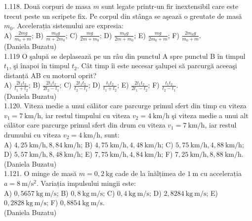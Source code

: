 1.118. Două corpuri de masa $m$ sunt legate printr-un fir inextensibil care este trecut peste un scripete fix. Pe corpul din stânga se aşează o greutate de masă $m_{0}$. Accelerația sistemului are expresia:\\ A) $\frac{2 m g}{m_{0}+m}$; B) $\frac{m_{0} g}{m+2 m_{0}}$; C) $\frac{m g}{2 m+m_{0}}$; D) $\frac{m_{0} g}{2 m+m_{0}}$; E) $\frac{m g}{2 m_{0}+m}$; F) $\frac{2 m_{0} g}{m_{0}+m}$.\\ (Daniela Buzatu)\\

1.119 O şalupă se deplasează pe un râu din punctul A spre punctul B în timpul $t_{1}$, şi înapoi în timpul $t_{2}$. Cât timp îi este necesar şalupei să parcurgă aceeaşi distanță AB cu motorul oprit?\\ A) $\frac{2 t_{1} t_{2}}{t_{1}+t_{2}}$; B) $\frac{2 t_{1} t_{2}}{2 t_{2}-t_{1}}$; C) $\frac{2 t_{1} t_{2}}{t_{2}-t_{1}}$; D) $\frac{t_{1} t_{2}}{t_{1}+t_{2}}$; E) $\frac{2 t_{1} t_{2}}{2 t_{1}-t_{2}}$; F) $\frac{t_{1} t_{2}}{t_{2}-t_{1}}$.\\ (Daniela Buzatu)\\

1.120. Viteza medie a unui călātor care parcurge primul sfert din timp cu viteza $v_{1}=7 \mathrm{~km} / \mathrm{h}$, iar restul timpului cu viteza $v_{2}=4 \mathrm{~km} / \mathrm{h}$ şi viteza medie a unui alt călător care parcurge primul sfert din drum cu viteza $v_{1}=7 \mathrm{~km} / \mathrm{h}$, iar restul drumului cu viteza $v_{2}=4 \mathrm{~km} / \mathrm{h}$, sunt:\\ A) $4,25 \mathrm{~km} / \mathrm{h}, 8,84 \mathrm{~km} / \mathrm{h}$; B) $4,75 \mathrm{~km} / \mathrm{h}, 4,48 \mathrm{~km} / \mathrm{h}$; C) $5,75 \mathrm{~km} / \mathrm{h}, 4,88 \mathrm{~km} / \mathrm{h}$; D) $5,57 \mathrm{~km} / \mathrm{h}, 8,48 \mathrm{~km} / \mathrm{h}$; E) $7,75 \mathrm{~km} / \mathrm{h}, 4,84 \mathrm{~km} / \mathrm{h}$; F) $7,25 \mathrm{~km} / \mathrm{h}, 8,88 \mathrm{~km} / \mathrm{h}$.\\ (Daniela Buzatu)\\

1.121. O minge de masă $m=0,2 \mathrm{~kg}$ cade de la înălțimea de $1 \mathrm{~m}$ cu accelerația $a=8 \mathrm{~m} / \mathrm{s}^{2}$. Variația impulsului mingii este:\\ A) $0,5657 \mathrm{~kg} \mathrm{~m} / \mathrm{s}$; B) $0,8 \mathrm{~kg} \mathrm{~m} / \mathrm{s}$; C) $0,4 \mathrm{~kg} \mathrm{~m} / \mathrm{s}$; D) $2,8284 \mathrm{~kg} \mathrm{~m} / \mathrm{s}$; E) $0,2828 \mathrm{~kg} \mathrm{~m} / \mathrm{s}$; F) $0,8854 \mathrm{~kg} \mathrm{~m} / \mathrm{s}$.\\ (Daniela Buzatu)\\

